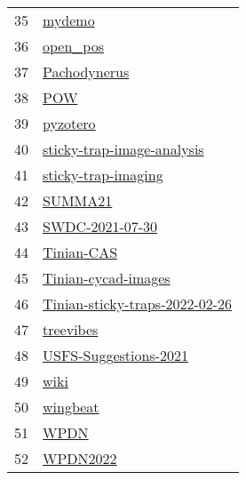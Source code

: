 \begin{longtable}{rl}
35 &                                                           \href{https://github.com/aubreymoore/mydemo}{mydemo} \\
36 &                                                       \href{https://github.com/aubreymoore/open_pos}{open_pos} \\
37 &                                               \href{https://github.com/aubreymoore/Pachodynerus}{Pachodynerus} \\
38 &                                                                 \href{https://github.com/aubreymoore/POW}{POW} \\
39 &                                                       \href{https://github.com/aubreymoore/pyzotero}{pyzotero} \\
40 &                   \href{https://github.com/aubreymoore/sticky-trap-image-analysis}{sticky-trap-image-analysis} \\
41 &                                 \href{https://github.com/aubreymoore/sticky-trap-imaging}{sticky-trap-imaging} \\
42 &                                                         \href{https://github.com/aubreymoore/SUMMA21}{SUMMA21} \\
43 &                                         \href{https://github.com/aubreymoore/SWDC-2021-07-30}{SWDC-2021-07-30} \\
44 &                                                   \href{https://github.com/aubreymoore/Tinian-CAS}{Tinian-CAS} \\
45 &                                 \href{https://github.com/aubreymoore/Tinian-cycad-images}{Tinian-cycad-images} \\
46 &           \href{https://github.com/aubreymoore/Tinian-sticky-traps-2022-02-26}{Tinian-sticky-traps-2022-02-26} \\
47 &                                                     \href{https://github.com/aubreymoore/treevibes}{treevibes} \\
48 &                             \href{https://github.com/aubreymoore/USFS-Suggestions-2021}{USFS-Suggestions-2021} \\
49 &                                                               \href{https://github.com/aubreymoore/wiki}{wiki} \\
50 &                                                       \href{https://github.com/aubreymoore/wingbeat}{wingbeat} \\
51 &                                                               \href{https://github.com/aubreymoore/WPDN}{WPDN} \\
52 &                                                       \href{https://github.com/aubreymoore/WPDN2022}{WPDN2022} \\
\end{longtable}
